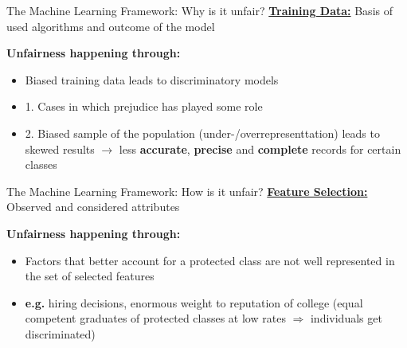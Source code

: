 \begin{frame}{The Machine Learning Framework: Why is it unfair? \cite{Barocas.2016, barocas-hardt-narayanan}}
    \underline{\textbf{Training Data:}} Basis of used algorithms and outcome of the model \newline 

    \begin{block}{\textbf{Unfairness happening through:}}
    \begin{itemize}
        \item Biased training data leads to discriminatory models
        \item 1. Cases in which prejudice has played some role
        \item 2. Biased sample of the population (under-/overrepresenttation) leads to skewed results\newline
        $\rightarrow$ less \textbf{accurate}, \textbf{precise} and \textbf{complete} records for certain classes
    \end{itemize}
        \end{block}
\end{frame}

\begin{frame}{The Machine Learning Framework: How is it unfair? \cite{Barocas.2016, barocas-hardt-narayanan}}
    \underline{\textbf{Feature Selection:}} Observed and considered attributes \newline 
    
    \begin{block}{\textbf{Unfairness happening through:}}
    \begin{itemize}
        \item Factors that better account for a protected class are not well represented in the set of selected features 
        \item \textbf{e.g.} hiring decisions, enormous weight to reputation of college (equal competent graduates of protected classes at low rates $\Rightarrow$ individuals get discriminated)
    \end{itemize}
        \end{block}
\end{frame}

